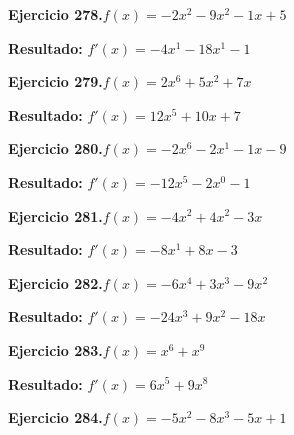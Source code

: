 \documentclass[10pt,a4paper]{article}
\begin{document}
\begin{ejbox}
\textbf{Ejercicio 278.}\quad $f(x) = -2x^{2} -9x^{2} -1x +5$
\end{ejbox}

\begin{solbox}
\textbf{Resultado:} \(\displaystyle f'(x) = -4x^{1} -18x^{1} -1\)
\end{solbox}

\begin{ejbox}
\textbf{Ejercicio 279.}\quad $f(x) = 2x^{6} +5x^2 +7x$
\end{ejbox}

\begin{solbox}
\textbf{Resultado:} \(\displaystyle f'(x) = 12x^{5} +10x +7\)
\end{solbox}

\newpage
\begin{ejbox}
\textbf{Ejercicio 280.}\quad $f(x) = -2x^{6} -2x^{1} -1x -9$
\end{ejbox}

\begin{solbox}
\textbf{Resultado:} \(\displaystyle f'(x) = -12x^{5} -2x^{0} -1\)
\end{solbox}

\begin{ejbox}
\textbf{Ejercicio 281.}\quad $f(x) = -4x^{2} +4x^2 -3x$
\end{ejbox}

\begin{solbox}
\textbf{Resultado:} \(\displaystyle f'(x) = -8x^{1} +8x -3\)
\end{solbox}

\begin{ejbox}
\textbf{Ejercicio 282.}\quad $f(x) = -6x^4 +3x^3 -9x^2$
\end{ejbox}

\begin{solbox}
\textbf{Resultado:} \(\displaystyle f'(x) = -24x^3 +9x^2 -18x\)
\end{solbox}

\newpage
\begin{ejbox}
\textbf{Ejercicio 283.}\quad $f(x) = x^{6} + x^{9}$
\end{ejbox}

\begin{solbox}
\textbf{Resultado:} \(\displaystyle f'(x) = 6x^{5} + 9x^{8}\)
\end{solbox}

\begin{ejbox}
\textbf{Ejercicio 284.}\quad $f(x) = -5x^{2} -8x^{3} -5x +1$
\end{ejbox}
\end{document}

